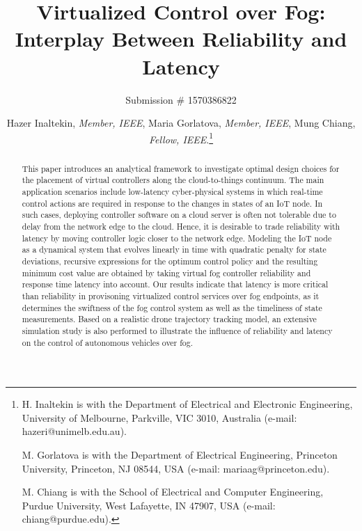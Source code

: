 \documentclass[10pt, journal, letterpaper]{IEEEtran}
\newcommand{\1}{\ensuremath{\mathbf{1}}} %
\begin{document}
\title{Virtualized Control over Fog: Interplay Between Reliability and Latency}

\author{Submission \# 1570386822 \vspace*{-0.0cm}}
\author{Hazer Inaltekin, \emph{Member, IEEE}, Maria Gorlatova, \emph{Member, IEEE}, Mung Chiang, \emph{Fellow, IEEE}.\thanks{H. Inaltekin is with the Department of Electrical and Electronic Engineering, University of Melbourne, Parkville, VIC 3010, Australia (e-mail: hazeri@unimelb.edu.au).

M. Gorlatova is with the Department of Electrical Engineering, Princeton University, Princeton, NJ 08544, USA (e-mail: mariaag@princeton.edu).

M. Chiang is with the School of Electrical and Computer Engineering, Purdue University, West Lafayette, IN 47907, USA (e-mail: chiang@purdue.edu).}}
\maketitle

\vspace*{-0.0cm}
\begin{abstract}
This paper introduces an analytical framework to investigate optimal design choices for the placement of virtual controllers along the cloud-to-things continuum. The main application scenarios include low-latency cyber-physical systems in which real-time control actions are required in response to the changes in states of an IoT node. In such cases, deploying controller software on a cloud server is often not tolerable due to delay from the  network edge to the cloud. Hence, it is desirable to trade reliability with latency by moving controller logic closer to the network edge. Modeling the IoT node as a dynamical system that evolves linearly in time with quadratic penalty for state deviations, recursive expressions for the optimum control policy and the resulting minimum cost value are obtained by taking virtual fog controller reliability and response time latency into account. Our results indicate that latency is more critical than reliability in provisoning virtualized control services over fog endpoints, as it determines the swiftness of the fog control system as well as the timeliness of state measurements. Based on a realistic drone trajectory tracking model, an extensive simulation study is also performed to illustrate the influence of reliability and latency on the control of autonomous vehicles over fog.
\end{abstract}
\end{document}
